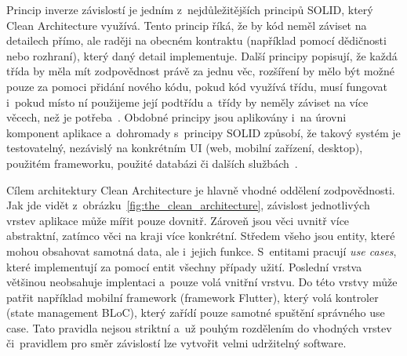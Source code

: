 \pagebreak
Princip inverze závislostí je jedním z~nejdůležitějších principů SOLID,
který Clean Architecture využívá.
Tento princip říká,
že by kód neměl záviset na detailech přímo,
ale raději na obecném kontraktu
(například pomocí dědičnosti nebo rozhraní),
který daný detail implementuje.
Další principy popisují,
že každá třída by měla mít zodpovědnost právě za jednu
věc,
rozšíření by mělo být možné pouze za pomoci přidání nového kódu,
pokud kód využívá třídu,
musí fungovat i~pokud místo ní použijeme její podtřídu
a~třídy by neměly záviset na více věcech,
než je potřeba~\cite[str.~61--91]{martin_clean_architecture}.
Obdobné principy jsou aplikovány i~na úrovni komponent aplikace
a~dohromady s~principy SOLID způsobí,
že takový systém je testovatelný,
nezávislý na konkrétním UI (web, mobilní zařízení, desktop),
použitém frameworku, použité databázi či dalších
službách~\cite{the_clean_architecture}.

Cílem architektury Clean Architecture je hlavně vhodné oddělení zodpovědnosti.
Jak jde vidět z~obrázku~\ref{fig:the_clean_architecture},
závislost jednotlivých vrstev aplikace může mířit pouze dovnitř.
Zároveň jsou věci uvnitř více abstraktní,
zatímco věci na kraji více konkrétní.
Středem všeho jsou entity,
které mohou obsahovat samotná data,
ale i~jejich funkce.
S~entitami pracují \emph{use cases},
které implementují za pomocí entit všechny případy užití.
Poslední vrstva většinou neobsahuje implentaci
a~pouze volá vnitřní vrstvu.
Do této vrstvy může patřit například mobilní framework (framework Flutter),
který volá kontroler (state management BLoC),
který zařídí pouze samotné spuštění správného use case.
Tato pravidla nejsou striktní a~už pouhým rozdělením do vhodných vrstev
či~pravidlem pro směr závislostí lze vytvořit velmi udržitelný
software.~\cite{the_clean_architecture}

